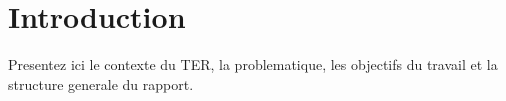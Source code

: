 \chapter{Introduction}

Presentez ici le contexte du TER, la problematique, les objectifs du travail et
la structure generale du rapport.
